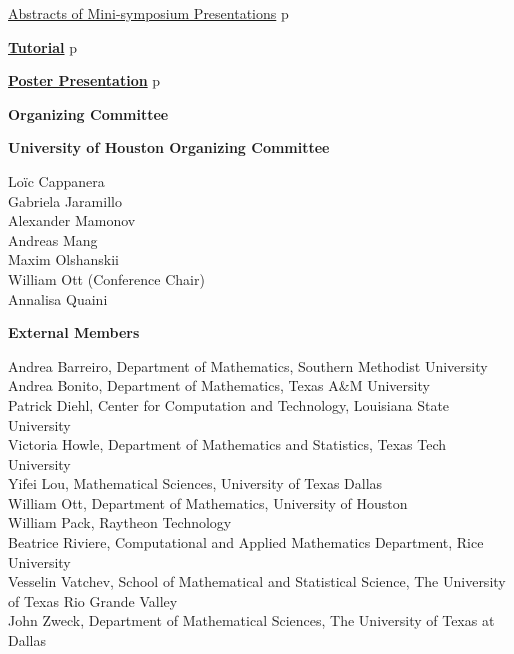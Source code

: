 \noindent\quad\hyperref[absmini]{{\large  Abstracts of Mini-symposium Presentations}}%
\dotfill{}p\pageref{absmini}
\vspace{3ex}

\noindent\hyperref[tutorial]{{\bfseries\large  Tutorial}}%
\dotfill{}p\pageref{tutorial}
\vspace{3ex}

\noindent\hyperref[poster]{{\bfseries\large  Poster Presentation}}
\dotfill{}p\pageref{poster}

\newpage\newpage
\thispagestyle{empty}
\newpage
\clearpage


\thispagestyle{empty}
\label{committee}
\centerline{\bfseries\Large Organizing Committee}
\vspace{10ex}

\noindent
{\bfseries\large  University of Houston Organizing Committee}
\vspace{1ex}

\noindent
Loïc Cappanera\\
Gabriela Jaramillo\\
Alexander Mamonov\\
Andreas Mang\\
Maxim Olshanskii\\
William Ott (Conference Chair)\\
Annalisa Quaini

\vspace{4ex}

\noindent
{\bfseries\large  External Members}

\vspace{1ex}

\noindent
Andrea Barreiro, Department of Mathematics, Southern Methodist University\\
Andrea Bonito, Department of Mathematics, Texas A\&M University\\
Patrick Diehl, Center for Computation and Technology, Louisiana State University\\
Victoria Howle, Department of Mathematics and Statistics, Texas Tech University\\
Yifei Lou, Mathematical Sciences, University of Texas Dallas\\
William Ott, Department of Mathematics, University of Houston\\
William Pack, Raytheon Technology\\
Beatrice Riviere, Computational and Applied Mathematics Department, Rice University\\
Vesselin Vatchev, School of Mathematical and Statistical Science, The University of Texas Rio Grande Valley\\
John Zweck, Department of Mathematical Sciences, The University of Texas at Dallas\\


\clearpage
